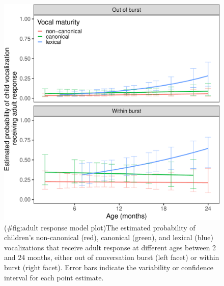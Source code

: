 \documentclass[
  man]{apa6}
\begin{document}
\begin{figure}
\centering
\includegraphics{turntaking_paper_files/figure-latex/adult response model plot-1.pdf}
\caption{(\#fig:adult response model plot)The estimated probability of children's non-canonical (red), canonical (green), and lexical (blue) vocalizations that receive adult response at different ages between 2 and 24 months, either out of conversation burst (left facet) or within burst (right facet). Error bars indicate the variability or confidence interval for each point estimate.}
\end{figure}
\end{document}
